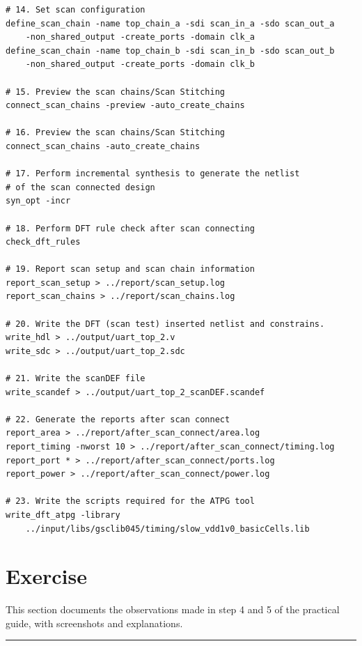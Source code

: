 \documentclass[a4paper,11pt]{article}%
\begin{document}
\begin{Verbatim}[frame=single]
# 14. Set scan configuration 
define_scan_chain -name top_chain_a -sdi scan_in_a -sdo scan_out_a
    -non_shared_output -create_ports -domain clk_a
define_scan_chain -name top_chain_b -sdi scan_in_b -sdo scan_out_b
    -non_shared_output -create_ports -domain clk_b

# 15. Preview the scan chains/Scan Stitching
connect_scan_chains -preview -auto_create_chains

# 16. Preview the scan chains/Scan Stitching
connect_scan_chains -auto_create_chains

# 17. Perform incremental synthesis to generate the netlist
# of the scan connected design
syn_opt -incr

# 18. Perform DFT rule check after scan connecting
check_dft_rules

# 19. Report scan setup and scan chain information
report_scan_setup > ../report/scan_setup.log
report_scan_chains > ../report/scan_chains.log

# 20. Write the DFT (scan test) inserted netlist and constrains.
write_hdl > ../output/uart_top_2.v
write_sdc > ../output/uart_top_2.sdc

# 21. Write the scanDEF file
write_scandef > ../output/uart_top_2_scanDEF.scandef

# 22. Generate the reports after scan connect
report_area > ../report/after_scan_connect/area.log
report_timing -nworst 10 > ../report/after_scan_connect/timing.log
report_port * > ../report/after_scan_connect/ports.log
report_power > ../report/after_scan_connect/power.log

# 23. Write the scripts required for the ATPG tool
write_dft_atpg -library
    ../input/libs/gsclib045/timing/slow_vdd1v0_basicCells.lib
\end{Verbatim}

\pagebreak
\section{Exercise}
This section documents the observations made in step 4 and 5 of the practical guide, with screenshots and explanations.\\


\vfill
\hrule
{\small


}
\end{document}

